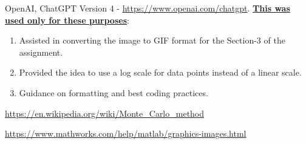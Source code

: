 \documentclass{article}
\begin{document}
\begin{thebibliography}{1}

	OpenAI, ChatGPT Version 4 - \url{https://www.openai.com/chatgpt}. \textbf{\underline{This was used only for these purposes}}:
	\begin{enumerate}
		\item Assisted in converting the image to GIF format for the Section-3 of the assignment.
		\item Provided the idea to use a log scale for data points instead of a linear scale.
		\item Guidance on formatting and best coding practices.
	\end{enumerate}

	\url{https://en.wikipedia.org/wiki/Monte_Carlo_method}

	\url{https://www.mathworks.com/help/matlab/graphics-images.html}
\end{thebibliography}
\end{document}
